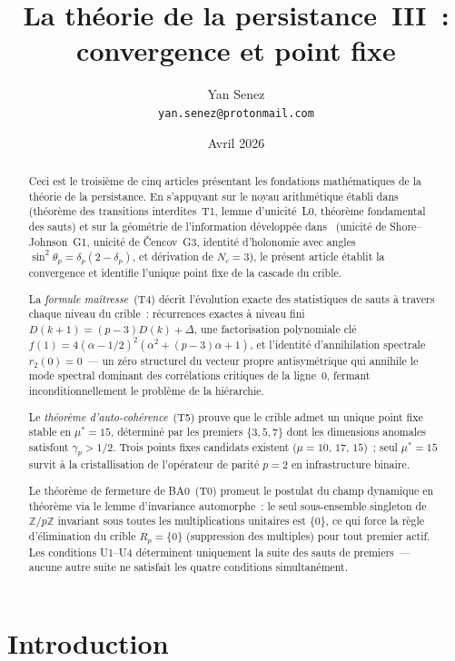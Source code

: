 \documentclass[12pt,a4paper]{article}
\title{\textbf{La théorie de la persistance~III~:\\
convergence et point fixe}}
\author{Yan Senez\\\texttt{yan.senez@protonmail.com}}
\date{Avril 2026}
\begin{document}
\maketitle

\begin{abstract}
Ceci est le troisième de cinq articles présentant les fondations
mathématiques de la théorie de la persistance. En s'appuyant sur le
noyau arithmétique établi dans~\cite{companion_M1} (théorème des
transitions interdites~T1, lemme d'unicité~L0, théorème fondamental
des sauts) et sur la géométrie de l'information développée
dans~\cite{companion_M2} (unicité de Shore--Johnson~G1, unicité de
\v{C}encov~G3, identité d'holonomie avec angles
$\sin^2\!\theta_p = \delta_p(2 - \delta_p)$, et dérivation de
$N_c = 3$), le présent article établit la convergence et identifie
l'unique point fixe de la cascade du crible.

La \emph{formule maîtresse}~(T4) décrit l'évolution exacte des
statistiques de sauts à travers chaque niveau du crible~: récurrences
exactes à niveau fini $D(k{+}1) = (p{-}3)D(k) + \Delta$, une
factorisation polynomiale clé
$f(1) = 4(\alpha - 1/2)^2(\alpha^2 + (p{-}3)\alpha + 1)$, et l'identité
d'annihilation spectrale $r_2(0) = 0$~--- un zéro structurel du
vecteur propre antisymétrique qui annihile le mode spectral dominant
des corrélations critiques de la ligne~0, fermant inconditionnellement
le problème de la hiérarchie.

Le \emph{théorème d'auto-cohérence}~(T5) prouve que le crible admet
un unique point fixe stable en $\mu^* = 15$, déterminé par les premiers
$\{3, 5, 7\}$ dont les dimensions anomales satisfont $\gamma_p > 1/2$.
Trois points fixes candidats existent ($\mu = 10$, $17$, $15$)~; seul
$\mu^* = 15$ survit à la cristallisation de l'opérateur de parité
$p = 2$ en infrastructure binaire.

Le théorème de fermeture de BA0~(T0) promeut le postulat du champ
dynamique en théorème via le lemme d'invariance automorphe~: le seul
sous-ensemble singleton de $\mathbb{Z}/p\mathbb{Z}$ invariant sous
toutes les multiplications unitaires est $\{0\}$, ce qui force la
règle d'élimination du crible $R_p = \{0\}$ (suppression des multiples)
pour tout premier actif. Les conditions U1--U4 déterminent uniquement
la suite des sauts de premiers~--- aucune autre suite ne satisfait les
quatre conditions simultanément.
\end{abstract}

\tableofcontents
\newpage

\section{Introduction}
\label{sec:introduction}
\end{document}
